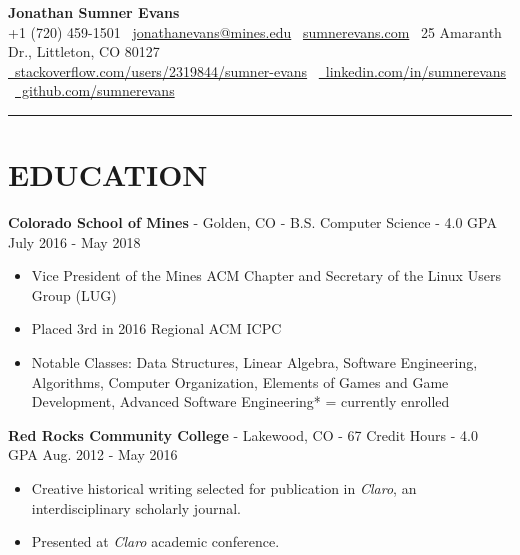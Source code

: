\documentclass[10.5pt,letterpaper]{article}
\begin{document}
\begin{center}
    \huge\textbf{Jonathan Sumner Evans} \\
    \vspace{3pt}
    \small +1 (720) 459-1501
    \textbar\ \href{mailto:jonathanevans@mines.edu}{jonathanevans@mines.edu}
    \textbar\ \href{http://sumnerevans.com}{sumnerevans.com}
    \textbar\ 25 Amaranth Dr., Littleton, CO 80127 \\
    \href{http://stackoverflow.com/users/2319844/sumner-evans}{\faStackOverflow\
    stackoverflow.com/users/2319844/sumner-evans}
    \textbar\ \href{https://www.linkedin.com/in/sumnerevans}{\faLinkedin\
    linkedin.com/in/sumnerevans}
    \textbar\ \href{https://github.com/sumnerevans}{\faGithub\
    github.com/sumnerevans}
    \rule{\textwidth}{0.5pt}
\end{center}

\section*{EDUCATION}
\textbf{Colorado School of Mines} - Golden, CO - B.S. Computer Science - 4.0 GPA
\hfill July 2016 - May 2018
\begin{itemize}
    \item Vice President of the Mines ACM Chapter and Secretary of the Linux
        Users Group (LUG)
    \item Placed 3rd in 2016 Regional ACM ICPC
    \item Notable Classes: Data Structures, Linear Algebra, Software
        Engineering, Algorithms, Computer Organization, Elements of Games and
        Game Development, Advanced Software Engineering* \hfill * = currently
        enrolled
\end{itemize}

\vspace{4pt}
\textbf{Red Rocks Community College} - Lakewood, CO - 67 Credit Hours - 4.0 GPA
\hfill Aug. 2012 - May 2016
\begin{itemize}
    \item Creative historical writing selected for publication in
        \textit{Claro}, an interdisciplinary scholarly journal.
    \item Presented at \textit{Claro} academic conference.
\end{itemize}
\end{document}
